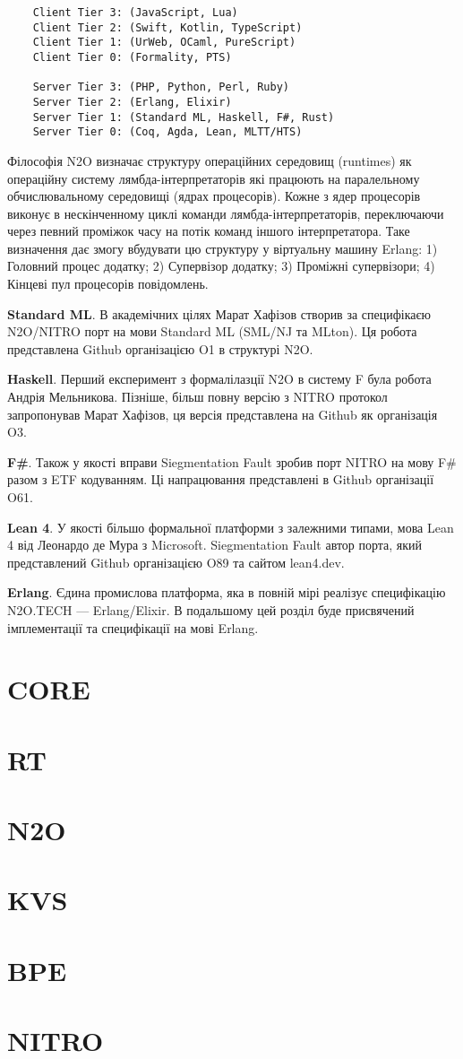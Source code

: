 \begin{lstlisting}
    Client Tier 3: (JavaScript, Lua)
    Client Tier 2: (Swift, Kotlin, TypeScript)
    Client Tier 1: (UrWeb, OCaml, PureScript)
    Client Tier 0: (Formality, PTS)

    Server Tier 3: (PHP, Python, Perl, Ruby)
    Server Tier 2: (Erlang, Elixir)
    Server Tier 1: (Standard ML, Haskell, F#, Rust)
    Server Tier 0: (Coq, Agda, Lean, MLTT/HTS)
\end{lstlisting}

Філософія N2O визначає структуру операційних середовищ (runtimes) як
операційну систему лямбда-інтерпретаторів які працюють на паралельному
обчислювальному середовищі (ядрах процесорів). Кожне з ядер процесорів
виконує в нескінченному циклі команди лямбда-інтерпретаторів, переключаючи
через певний проміжок часу на потік команд іншого інтерпретатора. Таке
визначення дає змогу вбудувати цю структуру у віртуальну машину Erlang:
1) Головний процес додатку; 2) Супервізор додатку; 3) Проміжні
супервізори; 4) Кінцеві пул процесорів повідомлень.

\textbf{Standard ML}. В академічних цілях Марат Хафізов створив
за специфікаєю N2O/NITRO порт на мови Standard ML (SML/NJ та MLton).
Ця робота представлена Github організацією O1 в структурі N2O.

\textbf{Haskell}. Перший експеримент з формалілазції N2O в систему F
була робота Андрія Мельникова. Пізніше, більш повну версію з NITRO протокол
запропонував Марат Хафізов, ця версія представлена на Github як організація O3.

\textbf{F#}. Також у якості вправи Siegmentation Fault зробив порт NITRO
на мову F# разом з ETF кодуванням. Ці напрацювання представлені в Github
організації O61.

\textbf{Lean 4}. У якості більшо формальної платформи з залежними типами,
мова Lean 4 від Леонардо де Мура з Microsoft. Siegmentation Fault автор порта,
який представлений Github організацією O89 та сайтом lean4.dev.

\textbf{Erlang}. Єдина промислова платформа, яка в повній мірі реалізує
специфікацію N2O.TECH --- Erlang/Elixir. В подальшому цей розділ буде присвячений
імплементації та специфікації на мові Erlang.

\section{CORE}

\section{RT}

\section{N2O}

\section{KVS}

\section{BPE}

\section{NITRO}

